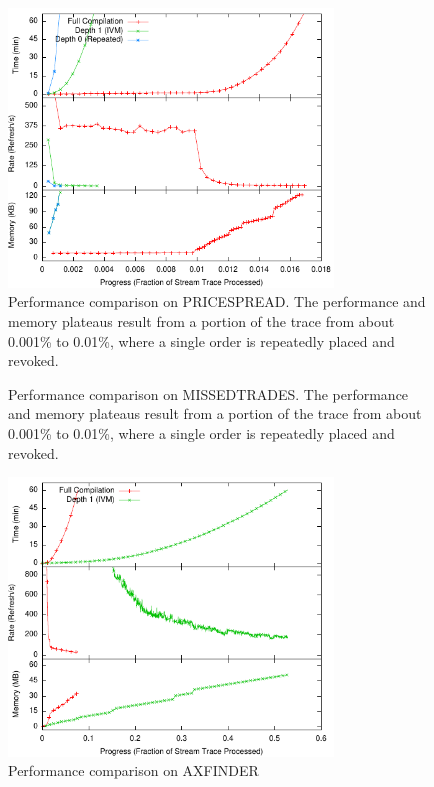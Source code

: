 \begin{figure}
\begin{center}
\includegraphics[width=3.4in]{../graphs/graphs/unified_pricespread.pdf}
\caption{Performance comparison on PRICESPREAD.  The performance and memory plateaus result from a portion of the trace from about 0.001\% to 0.01\%, where a single order is repeatedly placed and revoked.}
\label{fig:experiments:pricespread}
\end{center}
\end{figure}

\begin{figure}
\begin{center}
\caption{Performance comparison on MISSEDTRADES.  The performance and memory plateaus result from a portion of the trace from about 0.001\% to 0.01\%, where a single order is repeatedly placed and revoked.}
\label{fig:experiments:missedtrades}
\end{center}
\end{figure}


\begin{figure}
\begin{center}
\includegraphics[width=3.4in]{../graphs/graphs/unified_axfinder.pdf}
\caption{Performance comparison on AXFINDER}
\label{fig:experiments:axfinder}
\end{center}
\end{figure}

